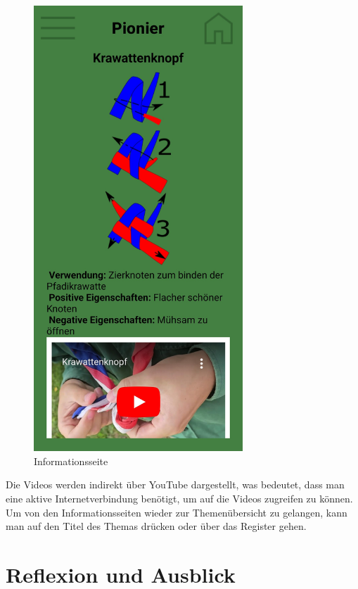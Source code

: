\begin{figure}[!hp]
\begin{minipage}[b]{0.4\textwidth}
        \includegraphics[width=0.7\textwidth]{Picture/inhaltsseite.jpg}
        \caption{Informationsseite}
        \label{fig:informationsseite}
    \end{minipage}
\end{figure}
Die Videos werden indirekt über YouTube dargestellt, was bedeutet, dass man eine aktive Internetverbindung benötigt, um auf die Videos zugreifen zu können. Um von den Informationsseiten wieder zur Themenübersicht zu gelangen, kann man auf den Titel des Themas drücken oder über das Register gehen.
\newpage

\section{Reflexion und Ausblick}

